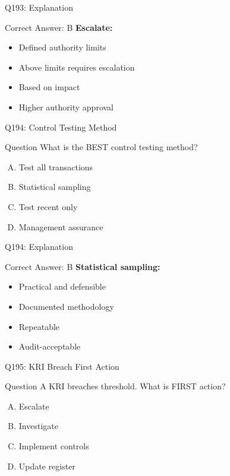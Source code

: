 \documentclass{beamer}
\begin{document}
	\begin{frame}{Q193: Explanation}
		\begin{block}{Correct Answer: B}
			\textbf{Escalate:}
			\begin{itemize}
				\item Defined authority limits
				\item Above limits requires escalation
				\item Based on impact
				\item Higher authority approval
			\end{itemize}
		\end{block}
	\end{frame}
	
	\begin{frame}{Q194: Control Testing Method}
		\begin{block}{Question}
			What is the BEST control testing method?
		\end{block}
		\begin{enumerate}[(A)]
			\item Test all transactions
			\item Statistical sampling
			\item Test recent only
			\item Management assurance
		\end{enumerate}
	\end{frame}
	
	\begin{frame}{Q194: Explanation}
		\begin{block}{Correct Answer: B}
			\textbf{Statistical sampling:}
			\begin{itemize}
				\item Practical and defensible
				\item Documented methodology
				\item Repeatable
				\item Audit-acceptable
			\end{itemize}
		\end{block}
	\end{frame}
	
	\begin{frame}{Q195: KRI Breach First Action}
		\begin{block}{Question}
			A KRI breaches threshold. What is FIRST action?
		\end{block}
		\begin{enumerate}[(A)]
			\item Escalate
			\item Investigate
			\item Implement controls
			\item Update register
		\end{enumerate}
	\end{frame}
	
\end{document}
